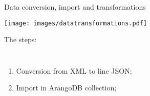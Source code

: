 \documentclass[aspectratio = 169, 15pt, handout]{beamer}
\begin{document}
    \begin{frame}{Data conversion, import and transformations}
        \begin{center}
            \vspace*{-0.1cm}
            \texttt{[image: images/datatransformations.pdf]}
        \end{center}
        
        \vspace*{-0.3cm}
        {\color{darkgray}The steps:}
        \begin{columns}[t]
                \vspace*{-0.3cm}
                \begin{enumerate}
                	\item \small Conversion from XML to line JSON;
                	\item \small Import in ArangoDB collection;
                \end{enumerate}
                

\end{columns}
\end{frame}
\end{document}
